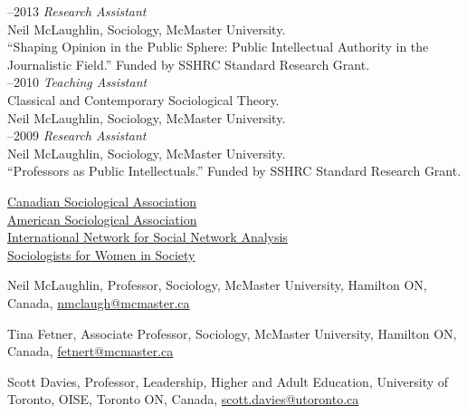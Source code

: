 \documentclass[9pt,usenames,dvipsnames]{article}
\begin{document}
–2013 {\it Research Assistant}\\
Neil McLaughlin, Sociology, McMaster University.\\ 
``Shaping Opinion in the Public Sphere: Public Intellectual Authority in the Journalistic Field.'' Funded by SSHRC Standard Research Grant.\\

–2010 {\it Teaching Assistant}\\
Classical and Contemporary Sociological Theory.\\
Neil McLaughlin, Sociology, McMaster University.\\

–2009 {\it Research Assistant}\\
Neil McLaughlin, Sociology, McMaster University.\\ 
``Professors as Public Intellectuals.'' Funded by SSHRC Standard Research Grant.\\





\noindent \href{http://www.csa-scs.ca}{Canadian Sociological Association} \\
\href{http://www.asanet.org}{American Sociological Association} \\
\href{http://www.insna.org}{International Network for Social Network Analysis} \\
\href{http://www.socwomen.org}{Sociologists for Women in Society} \\


\ind Neil McLaughlin, Professor, Sociology, McMaster University, Hamilton ON, Canada, \href{mailto:nmclaugh@mcmaster.ca}{nmclaugh@mcmaster.ca}

\ind Tina Fetner, Associate Professor, Sociology, McMaster University, Hamilton ON, Canada, \href{mailto:fetnert@mcmaster.ca}{fetnert@mcmaster.ca}

\ind Scott Davies, Professor, Leadership, Higher and Adult Education, University of Toronto, OISE, Toronto ON, Canada, \href{mailto:scott.davies@utoronto.ca}{scott.davies@utoronto.ca}
\end{document}
